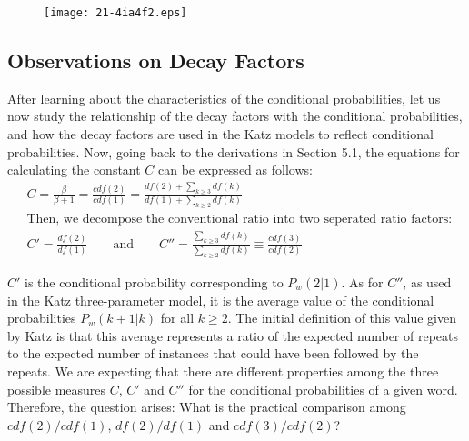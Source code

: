 \documentclass[english]{jnlp_1.4_rep}
\begin{document}
\begin{figure}[t]
\begin{center}
\texttt{[image: 21-4ia4f2.eps]}
\end{center}
\end{figure}


\subsection{Observations on Decay Factors}

After learning about the characteristics of the conditional probabilities, let us now study the
relationship of the decay factors with the conditional probabilities, and how the decay factors are
used in the Katz models to reflect conditional probabilities. Now, going back to the derivations in
Section 5.1, the equations for calculating the constant $C$ can be expressed as follows:
{\allowdisplaybreaks
\begin{align*}
 & C = \frac{\beta }{\beta + 1} = \frac{\mathit{cdf}(2)}{\mathit{cdf}(1)}
   = \frac{\mathit{df}(2) + \sum_{k \ge 3} {\mathit{df}(k)}}{\mathit{df}(1) +\sum_{k \ge 2} {\mathit{df}(k) } } \\
 & \mbox{Then, we decompose the conventional ratio into two seperated ratio factors: } \\
 & {C}'  = \frac{\mathit{df}(2) }{\mathit{df}(1) } \qquad \mbox{and} \qquad
	{C}'' = \frac{\sum_{k \ge 3} {\mathit{df}(k) } }{\sum_{k \ge 2}{\mathit{df}(k)}} \equiv \frac{\mathit{cdf}(3)}{\mathit{cdf}(2)}
\end{align*}
}

$C'$ is the conditional probability corresponding to $P_{w}(2 \vert 1)$. As for $C''$, as used in the Katz three-parameter model, it is the average
value of the conditional probabilities $P_{w}(k+1 \vert k)$ for all $k \geq 2$. The initial definition of this value given by Katz is that this
average represents a ratio of the expected number of repeats to the expected number of instances that could have been followed by the repeats. We
are expecting that there are different properties among the three possible measures $C$, $C'$ and $C''$ for the conditional probabilities of a given
word. Therefore, the question arises: What is the practical comparison among $\mathit{cdf}(2) / \mathit{cdf}(1)$, $\mathit{df}(2) / \mathit{df}(1)$
and $\mathit{cdf}(3) / \mathit{cdf}(2)$?
\end{document}

